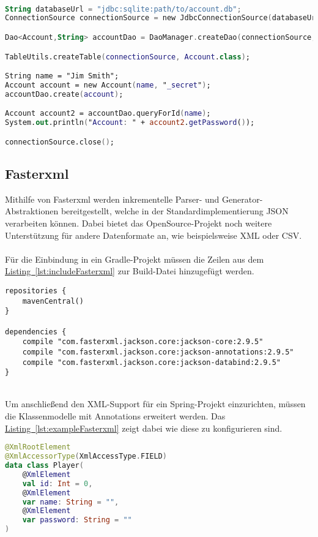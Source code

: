 \\
\begin{lstlisting}[style=lstStyleFramed, language=Kotlin, caption={Beispiel: Verwendung von ORMLite (verändert nach \cite{ormlite})}, label=lst:ormliteUsageExample, float]
String databaseUrl = "jdbc:sqlite:path/to/account.db";
ConnectionSource connectionSource = new JdbcConnectionSource(databaseUrl);

Dao<Account,String> accountDao = DaoManager.createDao(connectionSource, Account.class);

TableUtils.createTable(connectionSource, Account.class);

String name = "Jim Smith";
Account account = new Account(name, "_secret");
accountDao.create(account);

Account account2 = accountDao.queryForId(name);
System.out.println("Account: " + account2.getPassword());

connectionSource.close();
\end{lstlisting}

\subsection{Fasterxml}\label{sec:bibfasterxml}
Mithilfe von Fasterxml werden inkrementelle Parser- und Generator-Abstraktionen bereitgestellt, welche in der Standardimplementierung \gls{JSON} verarbeiten können. Dabei bietet das OpenSource-Projekt noch weitere Unterstützung für andere Datenformate an, wie beispielsweise \gls{XML} oder \gls{CSV}.\cite{fasterxml}\\
\\
Für die Einbindung in ein Gradle-Projekt müssen die Zeilen aus dem \hyperref[lst:includeFasterxml]{Listing~\ref{lst:includeFasterxml}} zur Build-Datei hinzugefügt werden.
\\
\begin{lstlisting}[style=lstStyleFramed, language=Gradle, caption={Einbindung der Bibliothek Fasterxml mithilfe von Gradle}, label=lst:includeFasterxml, float]
repositories {
	mavenCentral()
}

dependencies {
	compile "com.fasterxml.jackson.core:jackson-core:2.9.5"
	compile "com.fasterxml.jackson.core:jackson-annotations:2.9.5"
	compile "com.fasterxml.jackson.core:jackson-databind:2.9.5"
}
\end{lstlisting}
\\
Um anschließend den \gls{XML}-Support für ein Spring-Projekt einzurichten, müssen die Klassenmodelle mit Annotations erweitert werden. Das \hyperref[lst:exampleFasterxml]{Listing~\ref{lst:exampleFasterxml}} zeigt dabei wie diese zu konfigurieren sind.
\\
\begin{lstlisting}[style=lstStyleFramed, language=Kotlin, caption={Beispiel: Verwendung von Fasterxml}, label=lst:exampleFasterxml, float]
@XmlRootElement
@XmlAccessorType(XmlAccessType.FIELD)
data class Player(
	@XmlElement
	val id: Int = 0,
	@XmlElement
	var name: String = "",
	@XmlElement
	var password: String = ""
)
\end{lstlisting} 

